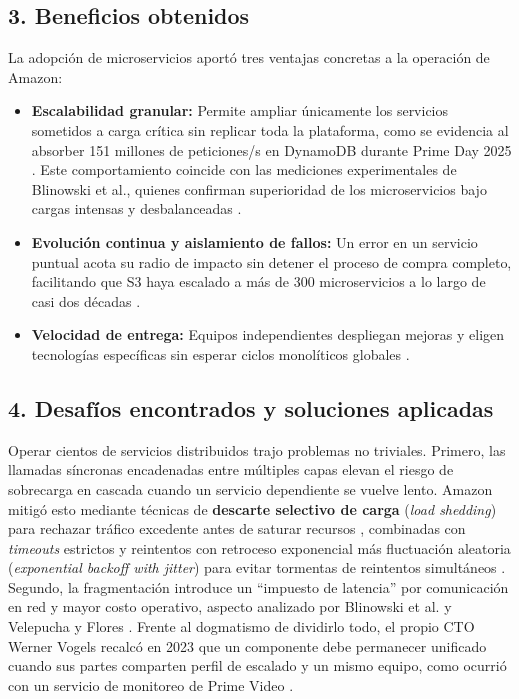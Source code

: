 \documentclass[10pt,letterpaper]{article}
\begin{document}
\subsection*{3. Beneficios obtenidos}
La adopción de microservicios aportó tres ventajas concretas a la operación de Amazon:
\begin{itemize}[leftmargin=*, itemsep=1pt, topsep=2pt]
    \item \textbf{Escalabilidad granular:} Permite ampliar únicamente los servicios sometidos a carga crítica sin replicar toda la plataforma, como se evidencia al absorber 151 millones de peticiones/s en DynamoDB durante Prime Day 2025 \cite{yun2025primeday}. Este comportamiento coincide con las mediciones experimentales de Blinowski et al., quienes confirman superioridad de los microservicios bajo cargas intensas y desbalanceadas \cite{blinowski2022monolithic}.
    \item \textbf{Evolución continua y aislamiento de fallos:} Un error en un servicio puntual acota su radio de impacto sin detener el proceso de compra completo, facilitando que S3 haya escalado a más de 300 microservicios a lo largo de casi dos décadas \cite{vogels2023monoliths}.
    \item \textbf{Velocidad de entrega:} Equipos independientes despliegan mejoras y eligen tecnologías específicas sin esperar ciclos monolíticos globales \cite{velepucha2023survey}.
\end{itemize}

\subsection*{4. Desafíos encontrados y soluciones aplicadas}
Operar cientos de servicios distribuidos trajo problemas no triviales. Primero, las llamadas síncronas encadenadas entre múltiples capas elevan el riesgo de sobrecarga en cascada cuando un servicio dependiente se vuelve lento. Amazon mitigó esto mediante técnicas de \textbf{descarte selectivo de carga} (\emph{load shedding}) para rechazar tráfico excedente antes de saturar recursos \cite{yanacek_loadshedding}, combinadas con \emph{timeouts} estrictos y reintentos con retroceso exponencial más fluctuación aleatoria (\emph{exponential backoff with jitter}) para evitar tormentas de reintentos simultáneos \cite{brooker_timeouts}. Segundo, la fragmentación introduce un ``impuesto de latencia'' por comunicación en red y mayor costo operativo, aspecto analizado por Blinowski et al. \cite{blinowski2022monolithic} y Velepucha y Flores \cite{velepucha2023survey}. Frente al dogmatismo de dividirlo todo, el propio CTO Werner Vogels recalcó en 2023 que un componente debe permanecer unificado cuando sus partes comparten perfil de escalado y un mismo equipo, como ocurrió con un servicio de monitoreo de Prime Video \cite{vogels2023monoliths}.
\end{document}
